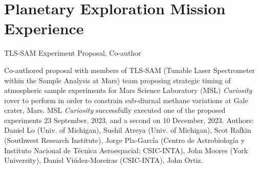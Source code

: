 \documentclass[11pt, letterpaper]{article}
\newcommand{\amper}{{\fontspec[Scale=.95]{Adobe Caslon Pro}\selectfont\itshape\&}}
\newcommand{\years}[1]{\marginnote{\scriptsize #1}}
\begin{document}
%
%
%

\section*{Planetary Exploration Mission Experience}
\label{sec:missions}  %
\noindent
\years{2023}TLS-SAM Experiment Proposal, Co-author

    Co-authored proposal with members of TLS-SAM (Tunable Laser Spectrometer
    within the Sample Analysis at Mars) team proposing strategic timing of
    atmospheric sample experiments for Mars Science Laboratory (MSL)
    \textit{Curiosity} rover to perform in order to constrain sub-diurnal
    methane variations at Gale crater, Mars. MSL \textit{Curiosity}
    successfully executed one of the proposed experiments 23 September, 2023,
    and a second on 10 December, 2023. Authors: Daniel Lo (Univ. of Michigan),
    Sushil Atreya (Univ. of Michigan), Scot Rafkin (Southwest Research
    Institute), Jorge Pla-Garc\'{i}a (Centro de Astrobiolog\'{i}a y Instituto Nacional de T\'{e}cnica Aeroespacial; CSIC-INTA),
    John Moores (York University), Daniel Vi\'{u}dez-Moreiras (CSIC-INTA), John
    Ortiz.

\end{document}
